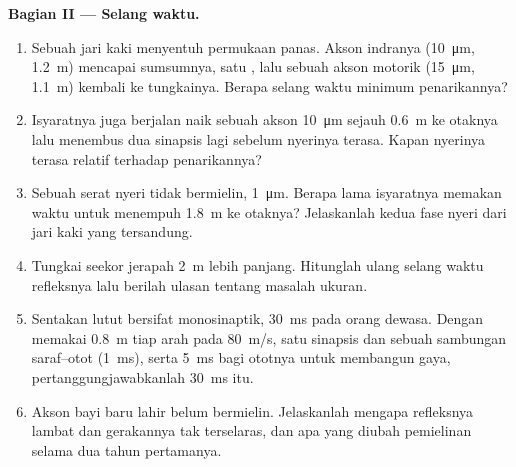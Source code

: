 \begin{problem}
\medskip
\noindent\textbf{Bagian II --- Selang waktu.}
\begin{enumerate}[resume]
  \item Sebuah jari kaki menyentuh permukaan panas. Akson indranya (\qty{10}{\micro m},
        \qty{1.2}{m}) mencapai sumsumnya, satu , lalu sebuah akson motorik
        (\qty{15}{\micro m}, \qty{1.1}{m}) kembali ke tungkainya. Berapa selang waktu
        minimum penarikannya?
  \item Isyaratnya juga berjalan naik sebuah akson \qty{10}{\micro m}
        sejauh \qty{0.6}{m} ke otaknya lalu menembus dua sinapsis lagi sebelum
        nyerinya terasa. Kapan nyerinya terasa relatif terhadap penarikannya?
  \item Sebuah serat nyeri tidak bermielin, \qty{1}{\micro m}. Berapa lama
        isyaratnya memakan waktu untuk menempuh \qty{1.8}{m} ke otaknya? Jelaskanlah
        kedua fase nyeri dari jari kaki yang tersandung.
  \item Tungkai seekor jerapah \qty{2}{m} lebih panjang. Hitunglah ulang selang waktu
        refleksnya lalu berilah ulasan tentang masalah ukuran.
  \item Sentakan lutut bersifat monosinaptik, \qty{30}{ms} pada orang dewasa. Dengan
        memakai \qty{0.8}{m} tiap arah pada \qty{80}{m/s}, satu sinapsis dan sebuah
        sambungan saraf--otot (\qty{1}{ms}), serta \qty{5}{ms} bagi
        ototnya untuk membangun gaya, pertanggungjawabkanlah \qty{30}{ms} itu.
  \item Akson bayi baru lahir belum bermielin. Jelaskanlah mengapa refleksnya
        lambat dan gerakannya tak terselaras, dan apa yang diubah pemielinan
        selama dua tahun pertamanya.
\end{enumerate}


\end{problem}
